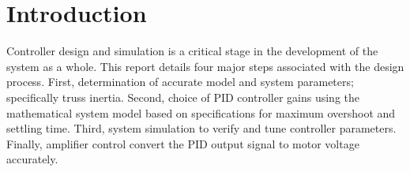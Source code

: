 \section{Introduction}

%

Controller design and simulation is a critical stage in the development of the system as a whole.
This report details four major steps associated with the design process.
First, determination of accurate model and system parameters; specifically truss inertia.
Second, choice of PID controller gains using the mathematical system model based on specifications for maximum overshoot and settling time.
Third, system simulation to verify and tune controller parameters.
Finally, amplifier control convert the PID output signal to motor voltage accurately.
 


